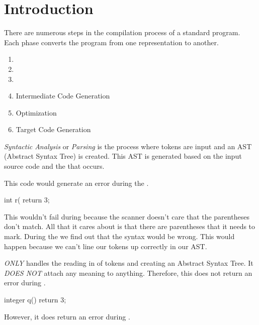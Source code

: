 \section{Introduction}\label{sec:Introduction}
There are numerous steps in the compilation process of a standard program.
Each phase converts the program from one representation to another.

\begin{enumerate}
\item {}
\item {}
\item {}
\item Intermediate Code Generation
\item Optimization
\item Target Code Generation
\end{enumerate}

\begin{definition}\label{def:Syntactic Analysis}
  \emph{Syntactic Analysis} or \emph{Parsing} is the process where tokens are input and an AST (Abstract Syntax Tree) is created.
  This AST is generated based on the input source code and the  that occurs.

  This code would generate an error during the .
  \begin{javasource}
    int r( {
      return 3;
    }
  \end{javasource}
  This wouldn't fail during  because the scanner doesn't care that the parentheses don't match.
  All that it cares about is that there are parentheses that it needs to mark.
  During the  we find out that the syntax would be wrong.
  This would happen because we can't line our tokens up correctly in our AST.
  
  \begin{remark}
     \emph{ONLY} handles the reading in of tokens and creating an Abstract Syntax Tree.
    It \emph{DOES NOT} attach any meaning to anything.
    Therefore, this does not return an error during .
    \begin{javasource}
      integer q() {
        return 3;
      }
    \end{javasource}
    However, it does return an error during .
  \end{remark}
\end{definition}

